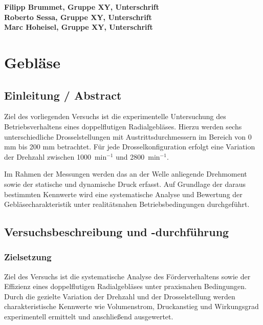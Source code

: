 \documentclass[pdfpaper,openbib, twoside, titlepage, halfparskip-,a4paper, 10pt]{scrarticle}
\begin{document}
\begin{titlepage}
\vspace{3cm}
\begin{flushleft}
\textbf{Filipp Brummet, Gruppe XY, Unterschrift} \\
\vspace{0.25cm}
\textbf{Roberto Sessa, Gruppe XY, Unterschrift} \\
\vspace{0.25cm}
\textbf{Marc Hoheisel, Gruppe XY, Unterschrift} \\
\end{flushleft}
\end{titlepage}
\tableofcontents
\newpage

\section{Gebläse}
\subsection{Einleitung / Abstract}
Ziel des vorliegenden Versuchs ist die experimentelle Untersuchung des Betriebsverhaltens eines doppelflutigen Radialgebläses. Hierzu werden sechs unterschiedliche Drosselstellungen mit Austrittsdurchmessern im Bereich von 0 mm bis 200 mm betrachtet. Für jede Drosselkonfiguration erfolgt eine Variation der Drehzahl zwischen 1000~min$^{-1}$ und 2800~min$^{-1}$. 

Im Rahmen der Messungen werden das an der Welle anliegende Drehmoment sowie der statische und dynamische Druck erfasst. Auf Grundlage der daraus bestimmten Kennwerte wird eine systematische Analyse und Bewertung der Gebläsecharakteristik unter realitätsnahen Betriebsbedingungen durchgeführt.


\subsection{Versuchsbeschreibung und -durchführung}
\subsubsection{Zielsetzung}
Ziel des Versuchs ist die systematische Analyse des Förderverhaltens sowie der Effizienz eines doppelflutigen Radialgebläses unter praxisnahen Bedingungen. Durch die gezielte Variation der Drehzahl und der Drosselstellung werden charakteristische Kennwerte wie Volumenstrom, Druckanstieg und Wirkungsgrad experimentell ermittelt und anschließend ausgewertet.
\end{document}
